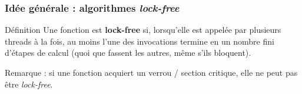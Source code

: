 \documentclass[xcolor={x11names,svgnames}]{beamer}
\begin{document}
\begin{frame}[label=lock-free-defs]
  \frametitle{Idée générale : algorithmes \emph{lock-free}}

  \begin{block}{Définition}
    Une fonction est \textbf{lock-free} si, lorsqu'elle est appelée par plusieurs
    threads à la fois, au moins l'une des invocations termine en un nombre fini
    d'étapes de calcul (quoi que fassent les autres, même s'ils bloquent).
  \end{block}

  \bigskip
  
  Remarque : si une fonction acquiert un verrou / section critique, elle ne peut
  pas être \emph{lock-free}.

  \pause\bigskip
  

\end{frame}

\end{document}
